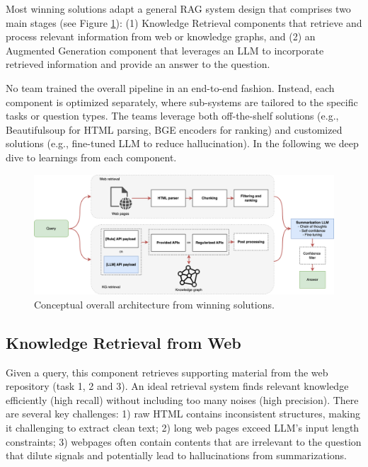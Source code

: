 Most winning solutions adapt a general RAG system design that comprises two main stages (see Figure \ref{fig:architecture}): (1) Knowledge Retrieval components that retrieve and process relevant information from web or knowledge graphs, and (2) an Augmented Generation component that leverages an LLM to incorporate retrieved information and provide an answer to the question. 

No team trained the overall pipeline in an end-to-end fashion. Instead, each component is optimized separately, where sub-systems are tailored to the specific tasks or question types. The teams leverage both off-the-shelf solutions (e.g., Beautifulsoup for HTML parsing, BGE encoders for ranking) and customized solutions (e.g., fine-tuned LLM to reduce hallucination). In the following we deep dive to learnings from each component.

\begin{figure}[th]
  \centering
  \includegraphics[width=16cm]{submissions/Xiao2024/figs/crag-architecture.drawio.png}
  \caption{Conceptual overall architecture from winning solutions.}
  \label{fig:architecture}
\end{figure}

\subsection{Knowledge Retrieval from Web}
Given a query, this component retrieves supporting material from the web repository (task 1, 2 and 3). An ideal retrieval system finds relevant knowledge efficiently (high recall) without including too many noises (high precision). There are several key challenges: 1) raw HTML contains inconsistent structures, making it challenging to extract clean text; 2) long web pages exceed LLM's input length constraints; 3) webpages often contain contents that are irrelevant to the question that dilute signals and potentially lead to hallucinations from summarizations.

